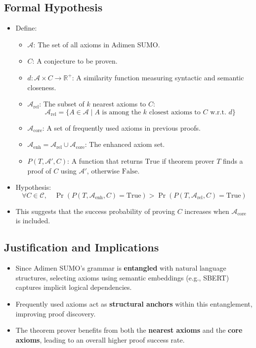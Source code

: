 \documentclass[english,version-2020-11]{uzl-thesis}
\begin{document}
\subsection{Formal Hypothesis}
\begin{itemize}
    \item Define:
    \begin{itemize}
        \item $\mathcal{A}$: The set of all axioms in Adimen SUMO.
        \item $C$: A conjecture to be proven.
        \item $d: \mathcal{A} \times C \to \mathbb{R}^+$: A similarity function measuring syntactic and semantic closeness.
        \item $\mathcal{A}_{\text{rel}}$: The subset of $k$ nearest axioms to $C$:
        \begin{equation}
            \mathcal{A}_{\text{rel}} = \{ A \in \mathcal{A} \mid A \text{ is among the } k \text{ closest axioms to } C \text{ w.r.t. } d \}
        \end{equation}
        \item $\mathcal{A}_{\text{core}}$: A set of frequently used axioms in previous proofs.
        \item $\mathcal{A}_{\text{enh}} = \mathcal{A}_{\text{rel}} \cup \mathcal{A}_{\text{core}}$: The enhanced axiom set.
        \item $P(T, \mathcal{A}', C)$: A function that returns $\text{True}$ if theorem prover $T$ finds a proof of $C$ using $\mathcal{A}'$, otherwise $\text{False}$.
    \end{itemize}
    \item Hypothesis:
    \begin{equation}
        \forall C \in \mathcal{C}, \quad \Pr(P(T, \mathcal{A}_{\text{enh}}, C) = \text{True}) > \Pr(P(T, \mathcal{A}_{\text{rel}}, C) = \text{True})
    \end{equation}
    \item This suggests that the success probability of proving $C$ increases when $\mathcal{A}_{\text{core}}$ is included.
\end{itemize}

\subsection{Justification and Implications}
\begin{itemize}
    \item Since Adimen SUMO’s grammar is \textbf{entangled} with natural language structures, selecting axioms using semantic embeddings (e.g., SBERT) captures implicit logical dependencies.
    \item Frequently used axioms act as \textbf{structural anchors} within this entanglement, improving proof discovery.
    \item The theorem prover benefits from both the \textbf{nearest axioms} and the \textbf{core axioms}, leading to an overall higher proof success rate.
\end{itemize}
\end{document}
